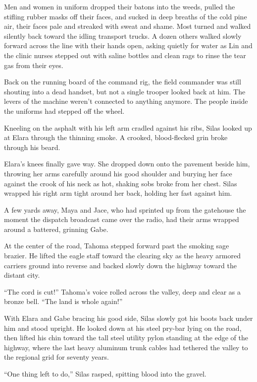Men and women in uniform dropped their batons into the weeds, pulled the stifling rubber masks off their faces, and sucked in deep breaths of the cold pine air, their faces pale and streaked with sweat and shame. Most turned and walked silently back toward the idling transport trucks. A dozen others walked slowly forward across the line with their hands open, asking quietly for water as Lin and the clinic nurses stepped out with saline bottles and clean rags to rinse the tear gas from their eyes. 

Back on the running board of the command rig, the field commander was still shouting into a dead handset, but not a single trooper looked back at him. The levers of the machine weren't connected to anything anymore. The people inside the uniforms had stepped off the wheel.

Kneeling on the asphalt with his left arm cradled against his ribs, Silas looked up at Elara through the thinning smoke. A crooked, blood-flecked grin broke through his beard. 

Elara’s knees finally gave way. She dropped down onto the pavement beside him, throwing her arms carefully around his good shoulder and burying her face against the crook of his neck as hot, shaking sobs broke from her chest. Silas wrapped his right arm tight around her back, holding her fast against him. 

A few yards away, Maya and Jace, who had sprinted up from the gatehouse the moment the dispatch broadcast came over the radio, had their arms wrapped around a battered, grinning Gabe. 

At the center of the road, Tahoma stepped forward past the smoking sage brazier. He lifted the eagle staff toward the clearing sky as the heavy armored carriers ground into reverse and backed slowly down the highway toward the distant city. 

``The cord is cut!'' Tahoma’s voice rolled across the valley, deep and clear as a bronze bell. ``The land is whole again!''

With Elara and Gabe bracing his good side, Silas slowly got his boots back under him and stood upright. He looked down at his steel pry-bar lying on the road, then lifted his chin toward the tall steel utility pylon standing at the edge of the highway, where the last heavy aluminum trunk cables had tethered the valley to the regional grid for seventy years.

``One thing left to do,'' Silas rasped, spitting blood into the gravel. 

